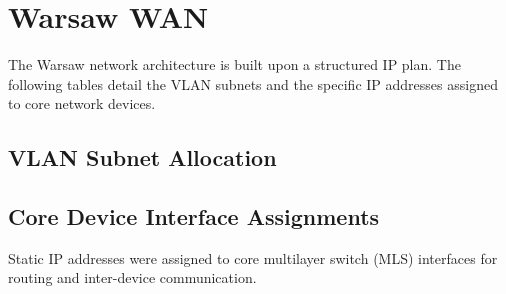 \chapter{Warsaw WAN}

The Warsaw network architecture is built upon a structured IP plan. The following tables detail the VLAN subnets and the specific IP addresses assigned to core network devices.

\section{VLAN Subnet Allocation}

\begin{table}[h!]
\centering
\caption{VLAN Subnet Allocation}
\label{tab:warsaw-vlan}
\end{table}



\section{Core Device Interface Assignments}

Static IP addresses were assigned to core multilayer switch (MLS) interfaces for routing and inter-device communication.

